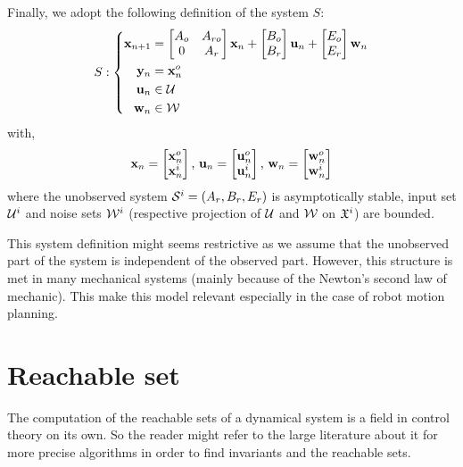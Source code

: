 Finally, we adopt the following definition of the system $S$:
\begin{equation} \label{lin_sys_decoupled}
S:
\left\{
\begin{aligned}
 \mathbf{x}_{n+1} &= 
\begin{bmatrix} A_o & A_{ro}\\ 0 & A_r \end{bmatrix}  \mathbf{x}_n
+\begin{bmatrix} B_o \\ B_r \end{bmatrix}  \mathbf{u}_n
+\begin{bmatrix} E_o\\ E_r \end{bmatrix}  \mathbf{w}_n\\
 \mathbf{y}_n &=  \mathbf{x}^o_n \\
 \mathbf{u}_n &\in \mathcal{U} \\
 \mathbf{w}_n &\in \mathcal{W} \\
\end{aligned}
\right.
\end{equation}
with,
\begin{align*}
 \mathbf{x}_n = \begin{bmatrix}
 \mathbf{x}^o_n\\
 \mathbf{x}^i_n
\end{bmatrix}
\textrm{, }
 \mathbf{u}_n = \begin{bmatrix}
 \mathbf{u}^o_n\\
 \mathbf{u}^i_n
\end{bmatrix}
\textrm{, }
 \mathbf{w}_n = \begin{bmatrix}
 \mathbf{w}^o_n\\
 \mathbf{w}^i_n
\end{bmatrix}
\end{align*}
where the unobserved system $\mathcal{S}^i=(A_r,B_r,E_r)$ is asymptotically stable, input set ${\mathcal{U}^i}$ and noise sets ${\mathcal{W}^i}$ (respective projection of $\mathcal{U}$ and $\mathcal{W}$ on $\mathfrak{X}^i$) are bounded.

This system definition might seems restrictive as we assume that the unobserved part of the system is independent of the observed part.
However, this structure is met in many mechanical systems (mainly because of the Newton's second law of mechanic).
This make this model relevant especially in the case of robot motion planning.

\section{Reachable set}
The computation of the reachable sets of a dynamical system is a field in control theory on its own.
So the reader might refer to the large literature about it for more precise algorithms in order to find invariants and the reachable sets.

